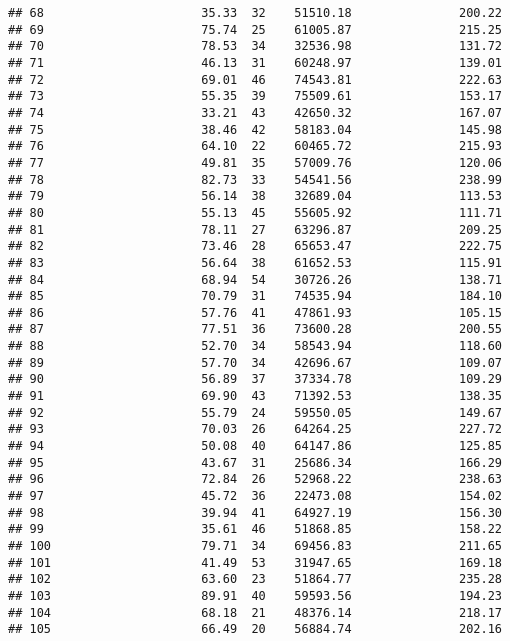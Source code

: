 \documentclass[
]{article}
\begin{document}
\begin{verbatim}
## 68                      35.33  32    51510.18               200.22
## 69                      75.74  25    61005.87               215.25
## 70                      78.53  34    32536.98               131.72
## 71                      46.13  31    60248.97               139.01
## 72                      69.01  46    74543.81               222.63
## 73                      55.35  39    75509.61               153.17
## 74                      33.21  43    42650.32               167.07
## 75                      38.46  42    58183.04               145.98
## 76                      64.10  22    60465.72               215.93
## 77                      49.81  35    57009.76               120.06
## 78                      82.73  33    54541.56               238.99
## 79                      56.14  38    32689.04               113.53
## 80                      55.13  45    55605.92               111.71
## 81                      78.11  27    63296.87               209.25
## 82                      73.46  28    65653.47               222.75
## 83                      56.64  38    61652.53               115.91
## 84                      68.94  54    30726.26               138.71
## 85                      70.79  31    74535.94               184.10
## 86                      57.76  41    47861.93               105.15
## 87                      77.51  36    73600.28               200.55
## 88                      52.70  34    58543.94               118.60
## 89                      57.70  34    42696.67               109.07
## 90                      56.89  37    37334.78               109.29
## 91                      69.90  43    71392.53               138.35
## 92                      55.79  24    59550.05               149.67
## 93                      70.03  26    64264.25               227.72
## 94                      50.08  40    64147.86               125.85
## 95                      43.67  31    25686.34               166.29
## 96                      72.84  26    52968.22               238.63
## 97                      45.72  36    22473.08               154.02
## 98                      39.94  41    64927.19               156.30
## 99                      35.61  46    51868.85               158.22
## 100                     79.71  34    69456.83               211.65
## 101                     41.49  53    31947.65               169.18
## 102                     63.60  23    51864.77               235.28
## 103                     89.91  40    59593.56               194.23
## 104                     68.18  21    48376.14               218.17
## 105                     66.49  20    56884.74               202.16

\end{verbatim}
\end{document}
